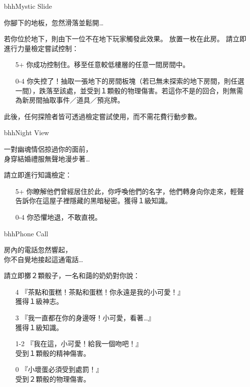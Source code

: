 \begin{EventCard}{bhh}{Mystic Slide}
  \begin{CardStory}
    你腳下的地板，忽然滑落並鬆開…
  \end{CardStory}
  \footnotesize
  若你位於地下，則由下一位不在地下玩家觸發此效果。\smallbreak
  放置一枚在此房。\smallbreak
  請立即進行力量檢定嘗試控制：
  \begin{itemize}
    \item[5+] 你成功控制住。移至任意較低樓層的任意一間房間中。
    \item[0-4] 你失控了！抽取一張地下的房間板塊（若已無未探索的地下房間，則任選一間），跌落至該處，並受到１顆骰的物理傷害。若這你不是的回合，則無需為新房間抽取事件／道具／預兆牌。
  \end{itemize}
  此後，任何探險者皆可透過檢定嘗試使用，而不需花費行動步數。\smallbreak
\end{EventCard}%
\linebreak[0]%
\begin{EventCard}{bhh}{Night View}
  \begin{CardStory}
    一對幽魂情侶掠過你的面前，\\
    身穿結婚禮服無聲地漫步著…
  \end{CardStory}
  請立即進行知識檢定：
  \begin{itemize}
    \item[5+] 你瞭解他們曾經居住於此，你呼喚他們的名字，他們轉身向你走來，輕聲告訴你在這屋子裡隱藏的黑暗秘密。獲得１級知識。
    \item[0-4] 你恐懼地退，不敢直視。
  \end{itemize}
\end{EventCard}%
\linebreak[0]%
\begin{EventCard}{bhh}{Phone Call}
  \begin{CardStory}
    房內的電話忽然響起，\\
    你不自覺地接起這通電話…
  \end{CardStory}
  請立即擲２顆骰子，一名和藹的奶奶對你說：
  \begin{itemize}
    \item[4] 『茶點和蛋糕！茶點和蛋糕！你永遠是我的小可愛！』\\
獲得１級神志。
    \item[3] 『我一直都在你的身邊呀！小可愛，看著…』\\
獲得１級知識。
    \item[1-2] 『我在這，小可愛！給我一個吻吧！』\\
受到１顆骰的精神傷害。
    \item[0] 『小壞蛋必須受到處罰！』\\
受到２顆骰的物理傷害。
  \end{itemize}
\end{EventCard}%
